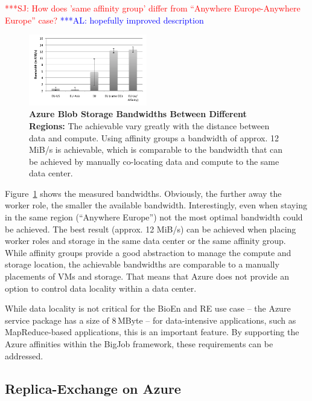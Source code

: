 \documentclass[conference,final]{IEEEtran}
\newcommand{\alnote}[1]{ {\textcolor{blue} { ***AL: #1 }}}
\newcommand{\jhanote}[1]{ {\textcolor{red} { ***SJ: #1 }}}
\newcommand{\alnote}[1]{}
\newcommand{\jhanote}[1]{}
\begin{document}
\jhanote{How does 'same affinity group' differ from ``Anywhere
  Europe-Anywhere Europe'' case?}\alnote{hopefully improved description}

\begin{figure}[htbp]
    \centering
        \includegraphics[width=0.46\textwidth]{performance/azure-data-transfer.pdf}
    \caption{\textbf{Azure Blob Storage Bandwidths Between Different Regions:} The achievable vary
    greatly with the distance between data and compute. Using affinity groups a bandwidth
    of approx. 12 MiB/s is achievable, which is comparable to the bandwidth that can
    be achieved by manually co-locating data and compute to the same data center.
    }
    \label{fig:performance_azure-data-transfer}
\end{figure}
Figure~\ref{fig:performance_azure-data-transfer} shows the measured
bandwidths. Obviously, the further away the worker role, the smaller
the available bandwidth. Interestingly, even when staying in the same
region (``Anywhere Europe'') not the most optimal bandwidth could be
achieved. The best result (approx. 12 MiB/s) can be achieved when
placing worker roles and storage in the same data center or the 
same affinity group. While affinity groups provide a good abstraction
to manage the compute and storage location, the achievable bandwidths
are comparable to a manually placements of VMs and storage. That means 
that Azure does not provide an option to control data locality within
a data center.

While data locality is not critical for the BioEn and RE use case --
the Azure service package has a size of 8\,MByte -- for data-intensive
applications, such as MapReduce-based applications, this is an important
feature. By supporting the Azure affinities within the BigJob framework,
these requirements can be addressed.

\subsection{Replica-Exchange on Azure}
\end{document}
